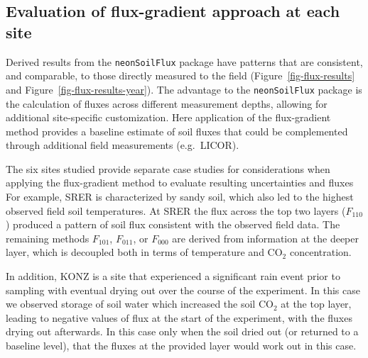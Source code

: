 \documentclass[
  letterpaper,
  DIV=11,
  numbers=noendperiod]{scrartcl}
\begin{document}
\subsection{Evaluation of flux-gradient approach at each
site}\label{evaluation-of-flux-gradient-approach-at-each-site}

Derived results from the \texttt{neonSoilFlux} package have patterns
that are consistent, and comparable, to those directly measured to the
field (Figure~\ref{fig-flux-results} and
Figure~\ref{fig-flux-results-year}). The advantage to the
\texttt{neonSoilFlux} package is the calculation of fluxes across
different measurement depths, allowing for additional site-specific
customization. Here application of the flux-gradient method provides a
baseline estimate of soil fluxes that could be complemented through
additional field measurements (e.g.~LICOR).

The six sites studied provide separate case studies for considerations
when applying the flux-gradient method to evaluate resulting
uncertainties and fluxes For example, SRER is characterized by sandy
soil, which also led to the highest observed field soil temperatures. At
SRER the flux across the top two layers (\(F_{110}\)) produced a pattern
of soil flux consistent with the observed field data. The remaining
methods \(F_{101}\), \(F_{011}\), or \(F_{000}\) are derived from
information at the deeper layer, which is decoupled both in terms of
temperature and CO\(_{2}\) concentration.

In addition, KONZ is a site that experienced a significant rain event
prior to sampling with eventual drying out over the course of the
experiment. In this case we observed storage of soil water which
increased the soil CO\(_{2}\) at the top layer, leading to negative
values of flux at the start of the experiment, with the fluxes drying
out afterwards. In this case only when the soil dried out (or returned
to a baseline level), that the fluxes at the provided layer would work
out in this case.
\end{document}
